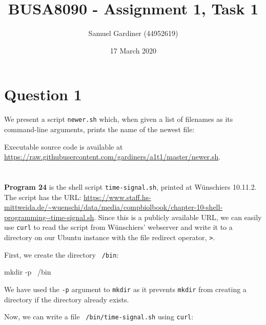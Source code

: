 \documentclass{article}
\title{BUSA8090 - Assignment 1, Task 1}
\author{Samuel Gardiner (44952619)}
\date{17 March 2020}
\begin{document}
\maketitle

\section{Question 1}

We present a script \texttt{newer.sh} which, when given a list of filenames as its command-line arguments, prints the name of the newest file:


Executable source code is available at \url{https://raw.githubusercontent.com/gardiners/a1t1/master/newer.sh}.

\section{}


\section{}

\subsection{}
\textbf{Program 24} is the shell script \texttt{time-signal.sh}, printed at Wünschiers 10.11.2. The script has the URL:
\url{https://www.staff.hs-mittweida.de/~wuenschi/data/media/compbiolbook/chapter-10-shell-programming--time-signal.sh}. Since this is a publicly available URL, we can easily use \texttt{curl} to read the script from Wünschiers' webserver and write it to a directory on our Ubuntu instance with the file redirect operator, \texttt{>}.

First, we create the directory \texttt{~/bin}:
\begin{bashcode}
mkdir -p ~/bin
\end{bashcode}

We have used the \texttt{-p} argument to \texttt{mkdir} as it prevents \texttt{mkdir} from creating a directory if the directory already exists.

Now, we can write a file \texttt{~/bin/time-signal.sh} using \texttt{curl}:

\begin{verbatim}

\end{verbatim}
\end{document}
